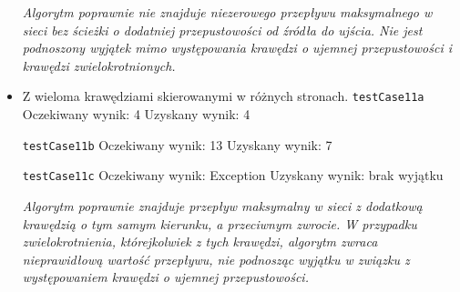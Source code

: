 \begin{itemize}[nosep]
    \emph{Algorytm poprawnie nie znajduje niezerowego przepływu maksymalnego
    w sieci bez ścieżki o dodatniej przepustowości od źródła do ujścia.
    Nie jest podnoszony wyjątek mimo występowania krawędzi o ujemnej przepustowości
    i krawędzi zwielokrotnionych.}

    \item Z wieloma krawędziami skierowanymi w różnych stronach.
    \texttt{testCase11a}
    Oczekiwany wynik: 4
    Uzyskany wynik: 4

    \texttt{testCase11b}
    Oczekiwany wynik: 13
    Uzyskany wynik: 7

    \texttt{testCase11c}
    Oczekiwany wynik: Exception
    Uzyskany wynik: brak wyjątku

    \emph{Algorytm poprawnie znajduje przepływ maksymalny w sieci z dodatkową
    krawędzią o tym samym kierunku, a przeciwnym zwrocie. W przypadku
    zwielokrotnienia, którejkolwiek z tych krawędzi, algorytm zwraca nieprawidłową
    wartość przepływu, nie podnosząc wyjątku w związku z występowaniem krawędzi
    o ujemnej przepustowości.}

\end{itemize}


